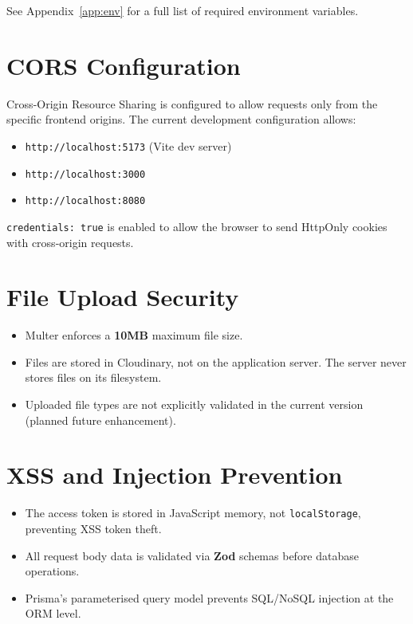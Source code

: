 See Appendix~\ref{app:env} for a full list of required environment variables.

\section{CORS Configuration}

Cross-Origin Resource Sharing is configured to allow requests only from the specific frontend origins. The current development configuration allows:

\begin{itemize}
  \item \texttt{http://localhost:5173} (Vite dev server)
  \item \texttt{http://localhost:3000}
  \item \texttt{http://localhost:8080}
\end{itemize}

\texttt{credentials: true} is enabled to allow the browser to send HttpOnly cookies with cross-origin requests.

\section{File Upload Security}

\begin{itemize}
  \item Multer enforces a \textbf{10MB} maximum file size.
  \item Files are stored in Cloudinary, not on the application server. The server never stores files on its filesystem.
  \item Uploaded file types are not explicitly validated in the current version (planned future enhancement).
\end{itemize}

\section{XSS and Injection Prevention}

\begin{itemize}
  \item The access token is stored in JavaScript memory, not \texttt{localStorage}, preventing XSS token theft.
  \item All request body data is validated via \textbf{Zod} schemas before database operations.
  \item Prisma's parameterised query model prevents SQL/NoSQL injection at the ORM level.
\end{itemize}

